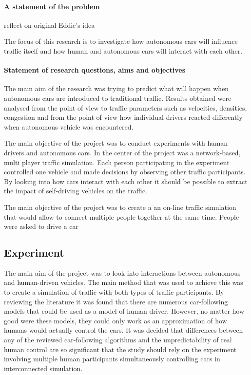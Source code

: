 \documentclass[11pt,english]{article}
\begin{document}
\paragraph{A statement of the problem}

reflect on original Eddie's idea


The focus of this research is to investigate how autonomous cars will influence traffic itself and how human and autonomous cars will interact with each other.

\paragraph{Statement of research questions, aims and objectives}

The main aim of the research was trying to predict what will happen when autonomous cars are introduced to traditional traffic. Results obtained were analysed from the point of view to traffic parameters such as velocities, densities, congestion and from the point of view how individual drivers reacted differently when autonomous vehicle was encountered.

The main objective of the project was to conduct experiments with human drivers and autonomous cars. In the center of the project was a network-based, multi player traffic simulation. Each person participating in the experiment controlled one vehicle and made decisions by observing other traffic participants. By looking into how cars interact with each other it should be possible to extract the impact of self-driving vehicles on the traffic. 



The main objective of the project was to create a an on-line traffic simulation that would allow to connect multiple people together at the same time. People were asked to drive a car 



\subsection{Experiment}


The main aim of the project was to look into interactions between autonomous and human-driven vehicles. The main method that was used to achieve this was to create a simulation of traffic with both types of traffic participants. By reviewing the literature it was found that there are numerous car-following models that could be used as a model of human driver. However, no matter how good were these models, they could only work as an approximation of how humans would actually control the cars. It was decided that differences between any of the reviewed car-following algorithms and the unpredictability of real human control are so significant that the study should rely on the experiment involving multiple human participants simultaneously controlling cars in interconnected simulation.
 
\end{document}
